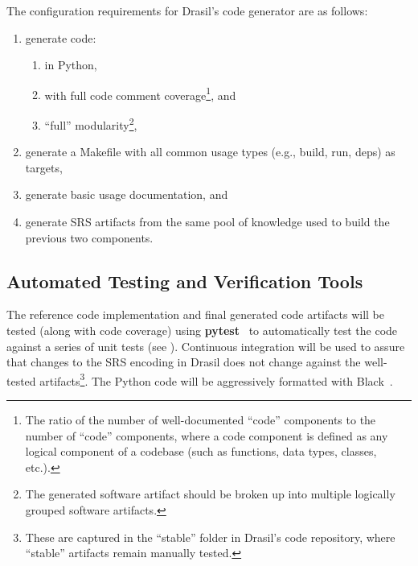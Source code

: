 \documentclass[12pt, titlepage]{article}
\begin{document}
The configuration requirements for Drasil's code generator are as follows:

\begin{enumerate}

    \item generate code:

          \begin{enumerate}

              \item in Python,

              \item with full code comment coverage\footnote{The ratio of the
                        number of well-documented ``code'' components to the
                        number of ``code'' components, where a code component is
                        defined as any logical component of a codebase (such as
                        functions, data types, classes, etc.).}, and

              \item ``full'' modularity\footnote{The generated software artifact
                        should be broken up into multiple logically grouped
                        software artifacts.},

          \end{enumerate}

    \item generate a Makefile with all common usage types (e.g., build, run,
          deps) as targets,

    \item generate basic usage documentation, and

    \item generate SRS artifacts from the same pool of knowledge used to build
          the previous two components.

\end{enumerate}

\subsection{Automated Testing and Verification Tools}

The reference code implementation and final generated code artifacts will be
tested (along with code coverage) using \textbf{pytest}~\cite{PyTest} to
automatically test the code against a series of unit tests (see
). Continuous integration will be used to assure
that changes to the SRS encoding in Drasil does not change against the
well-tested artifacts\footnote{These are captured in the ``stable'' folder in
    Drasil's code repository, where ``stable'' artifacts remain manually tested.}.
The Python code will be aggressively formatted with Black~\cite{PythonBlack}.
\end{document}
